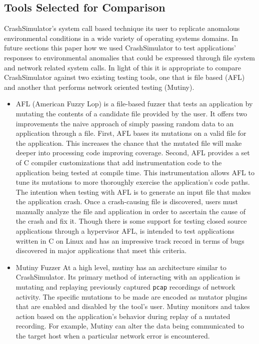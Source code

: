 \subsection{Tools Selected for Comparison}

CrashSimulator's system call based technique its user to replicate
anomalous environmental conditions in a wide variety of operating systems
domains.  In future sections this paper how we used CrashSimulator to test
applications' responses to environmental anomalies that could be expressed
through file system and network related system calls.  In light of this it
is appropriate to compare CrashSimulator against two existing testing
tools, one that is file based (AFL) and another that performs network
oriented testing (Mutiny).

\begin{itemize}

\item{AFL} (American Fuzzy Lop) is a file-based fuzzer that tests an
application by mutating the contents of a candidate file provided by
the user.  It offers two improvements the naive approach of simply
passing random data to an application through a file.  First, AFL
bases its mutations on a valid file for the application.  This
increases the chance that the mutated file will make deeper into
processing code improving coverage.  Second, AFL provides a set of
C compiler customizations that add instrumentation code to the
application being tested at compile time.  This instrumentation
allows AFL to tune its mutations to more thoroughly exercise the
application's code paths.  The intention when testing with AFL is
to generate an input file that makes the application crash.  Once a
crash-causing file is discovered, users must manually analyze the
file and application in order to ascertain the cause of the crash
and fix it.  Though there is some support for testing closed source
applications through a hypervisor AFL, is intended to test
applications written in C on Linux and has an impressive track
record in terms of bugs discovered in major applications that meet
this criteria.

\item{Mutiny Fuzzer} At a high level, mutiny has an architecture similar to
CrashSimulator.  Its primary method of interacting with an application
is mutating and replaying previously captured {\tt pcap} recordings
of network activity.  The specific mutations to be made are encoded
as mutator plugins that are enabled and disabled by the tool's
user.  Mutiny monitors and takes action based on the application's
behavior during replay of a mutated recording.  For example, Mutiny
can alter the data being communicated to the target host when a
particular network error is encountered.

\end{itemize}


